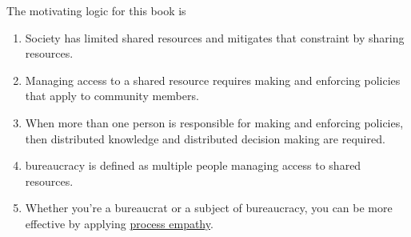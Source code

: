The motivating logic for this book is 
\begin{enumerate}
    \item Society has limited \glspl{shared resource} and mitigates that constraint by sharing resources.
    \item Managing access to a shared resource requires making and enforcing policies that apply to community members. 
    \item When more than one person is responsible for making and enforcing policies, then distributed knowledge and distributed decision making are required. 
    \item \Gls{bureaucracy} is defined as multiple people managing access to \glspl{shared resource}. 
    \item Whether you're a \gls{bureaucrat} or a subject of bureaucracy, you can be more effective by applying \hyperref[sec:process-empathy]{process empathy}.
\end{enumerate}

